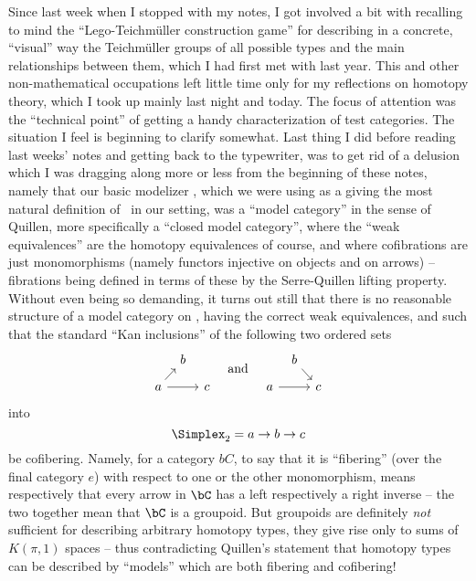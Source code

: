 \label{sec:30}%
Since last week when I stopped with my notes, I got involved a bit
with recalling to mind the ``Lego-Teichm\"uller construction game''
for describing in a concrete, ``visual'' way the Teichm\"uller groups
of all possible types and the main relationships between them, which I
had first met with last year. This and other non-mathematical
occupations left little time only for my reflections on homotopy
theory, which I took up mainly last night and today. The focus of
attention was the ``technical point'' of getting a handy
characterization of test categories. The situation I feel is beginning
to clarify somewhat. Last thing I did before reading last weeks' notes
and getting back to the typewriter, was to get rid of a delusion which
I was dragging along more or less from the beginning of these notes,
namely that our basic modelizer \Cat, which we were using as a giving
the most natural definition of \Hot\ in our setting, was a ``model
category'' in the sense of Quillen, more specifically a ``closed model
category'', where the ``weak equivalences'' are the homotopy
equivalences of course, and where cofibrations are just monomorphisms
(namely functors injective on objects and on arrows) -- fibrations
being defined in terms of these by the Serre-Quillen lifting
property. Without even being so demanding, it turns out still that
there is no reasonable structure of a model category on \Cat, having
the correct weak equivalences, and such that the standard ``Kan
inclusions'' of the following two ordered sets
\[
\begin{tikzcd}[row sep=small,column sep=tiny]
  & b & \\ a\ar[ur]\ar[rr] & & c
\end{tikzcd} \quad\text{and}\quad
\begin{tikzcd}[row sep=small,column sep=tiny]
  & b\ar[dr] & \\ a\ar[rr] & & c
\end{tikzcd}\]
into
\[\Simplex_2 = a \to b \to c\]
be cofibering. Namely, for a category $bC$, to say that it is
``fibering'' (over the final category $e$) with respect to one
or the other monomorphism, means respectively that every arrow in
$\bC$ has a left respectively a right inverse -- the two together mean
that $\bC$ is a groupoid. But groupoids are definitely \emph{not}
sufficient for describing arbitrary homotopy types, they give rise
only to sums of $K(\pi,1)$ spaces -- thus contradicting Quillen's
statement that homotopy types can be described by ``models'' which are
both fibering and cofibering!

